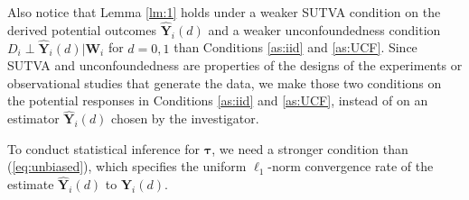 \documentclass[12pt]{article}
\def\T{{ \mathrm{\scriptscriptstyle T} }}
\theoremstyle{definition}
\newcommand{\E}{\rm E}
\newcommand{\bT}{{\mathbf T}}
\newcommand{\bW}{{\mathbf W}}
\newcommand{\bY}{{\mathbf Y}}
\newcommand{\btau}{\boldsymbol{\tau}}
\begin{document}
Also notice that Lemma \ref{lm:1} holds under 
a weaker SUTVA condition on the derived potential outcomes $\hat{\bY}_{i}(d)$ and
a weaker unconfoundedness condition $D_i \perp \hat{\bY}_{i}(d) | \bW_i$ for $d = 0, 1$
than Conditions \ref{as:iid} and \ref{as:UCF}. 
Since SUTVA and unconfoundedness are properties of the designs of the experiments or observational studies that generate the data, we make those two
conditions on the potential responses in Conditions \ref{as:iid} and \ref{as:UCF}, instead of on an estimator $\hat{\bY}_{i}(d)$ chosen by the investigator.


To conduct statistical inference for $\btau$, we need a stronger condition than (\ref{eq:unbiased}), which specifies the uniform $\ell_1$-norm convergence rate of the estimate $\hat{\bY}_{i}(d)$ to 
$\bY_{i}(d)$.
\end{document}
